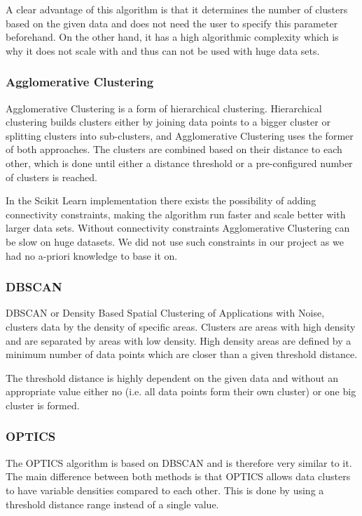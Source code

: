 A clear advantage of this algorithm is that it determines the number of clusters based on the given data and does not need the user to specify this parameter beforehand. On the other hand, it has a high algorithmic complexity which is why it does not scale with and thus can not be used with huge data sets.

\subsubsection{Agglomerative Clustering}
Agglomerative Clustering is a form of hierarchical clustering. Hierarchical clustering builds clusters either by joining data points to a bigger cluster or splitting clusters into sub-clusters, and Agglomerative Clustering uses the former of both approaches. The clusters are combined based on their distance to each other, which is done until either a distance threshold or a pre-configured number of clusters is reached.\cite{yildirim_2020}

In the Scikit Learn implementation there exists the possibility of adding connectivity constraints, making the algorithm run faster and scale better with larger data sets. Without connectivity constraints Agglomerative Clustering can be slow on huge datasets. We did not use such constraints in our project as we had no a-priori knowledge to base it on.

\subsubsection{DBSCAN}
DBSCAN or Density Based Spatial Clustering of Applications with Noise, clusters data by the density of specific areas. Clusters are areas with high density and are separated by areas with low density. High density areas are defined by a minimum number of data points which are closer than a given threshold distance.\cite{dbscan_paper}

The threshold distance is highly dependent on the given data and without an appropriate value either no (i.e. all data points form their own cluster) or one big cluster is formed.

\subsubsection{OPTICS}
The OPTICS algorithm is based on DBSCAN and is therefore very similar to it. The main difference between both methods is that OPTICS allows data clusters to have variable densities compared to each other. This is done by using a threshold distance range instead of a single value.\cite{optics_paper}

